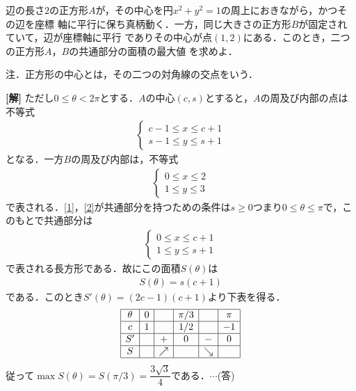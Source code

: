 \documentclass[a4j]{jarticle}
\begin{document}

     \begin{oframed}
     辺の長さ$2$の正方形$A$が，その中心を円$x^2+y^2=1$の周上におきながら，かつその辺を座標   
     軸に平行に保ち真柄動く．一方，同じ大きさの正方形$B$が固定されていて，辺が座標軸に平行
     でありその中心が点$(1,2)$にある．このとき，二つの正方形$A$，$B$の共通部分の面積の最大値
     を求めよ．
     
     注．正方形の中心とは，その二つの対角線の交点をいう．
     \end{oframed}

\setlength{\columnseprule}{0.4pt}
\begin{multicols}{2}
{\bf[解]}\1 ただし$0\le\theta<2\pi$とする．$A$の中心$(c,s)$とすると，$A$の周及び内部の点は不等式
     \begin{align}
     \left\{
          \begin{array}{l}
          c-1\le x\le c+1 \\
          s-1\le y\le s+1
          \end{array}
     \right.\label{1}
     \end{align}
となる．一方$B$の周及び内部は，不等式
     \begin{align}
     \left\{
          \begin{array}{l}
          0\le x\le2 \\
          1\le y\le3
          \end{array}
     \right.\label{2}
     \end{align}
で表される．\eqref{1}，\eqref{2}が共通部分を持つための条件は$s\ge0$つまり$0\le\theta\le\pi$で，このもとで共通部分は
     \begin{align}
     \left\{
          \begin{array}{l}
          0\le x\le c+1\\
          1\le y\le s+1
          \end{array}
     \right.\label{3}
     \end{align}    
で表される長方形である．故にこの面積$S(\theta)$は 
     \begin{align*}
     S(\theta)=s(c+1)
     \end{align*}
である．このとき$S'(\theta)=(2c-1)(c+1)$より下表を得る．
     \begin{align*}
          \begin{array}{|c|c|c|c|c|c|} \hline
          \theta & 0 &     &\pi/3 &      & \pi \\ \hline
          c        & 1 &     &  1/2 &      & -1  \\ \hline      
          S'       &    &+   &0     &  -   & 0   \\ \hline
          S        &    &\nearrow&       & \searrow&      \\ \hline
           \end{array}
     \end{align*}
従って$\max S(\theta)=S(\pi/3)=\dfrac{3\sqrt{3}}{4}$である．$\cdots$(答)     
\newpage
\end{multicols}
\end{document}
